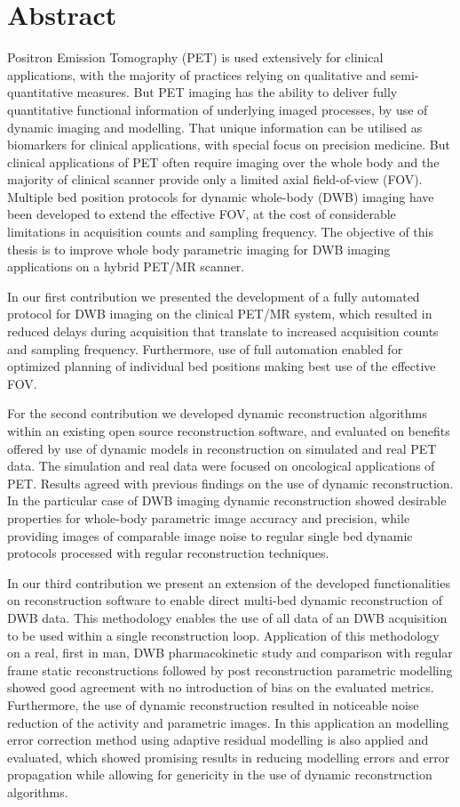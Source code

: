 \section*{Abstract}

Positron Emission Tomography (PET) is used extensively for clinical applications, with the majority of practices relying on qualitative and semi-quantitative measures. But PET imaging has the ability to deliver fully quantitative functional information of underlying imaged processes, by use of dynamic imaging and modelling. That unique information can be utilised as biomarkers for clinical applications, with special focus on precision medicine. But clinical applications of PET often require imaging over the whole body and the majority of clinical scanner provide only a limited axial field-of-view (FOV). Multiple bed position protocols for dynamic whole-body (DWB) imaging have been developed to extend the effective FOV, at the cost of considerable limitations in acquisition counts and sampling frequency.   The objective of this thesis is to improve whole body parametric imaging for DWB imaging applications on a hybrid PET/MR scanner.

In our first contribution we presented the development of a fully automated protocol for DWB imaging on the clinical PET/MR system, which resulted in reduced delays during acquisition that translate to increased acquisition counts and sampling frequency. Furthermore, use of full automation enabled for optimized planning of individual bed positions making best use of the effective FOV. 

For the second contribution we developed dynamic reconstruction algorithms within an existing open source reconstruction software, and evaluated on benefits offered by use of dynamic models in reconstruction on simulated and real PET data. 
The simulation and real data were focused on oncological applications of PET. Results agreed with previous findings on the use of dynamic reconstruction. In the particular case of DWB imaging dynamic reconstruction showed desirable properties for whole-body parametric image accuracy and precision, while providing images of comparable image noise to regular single bed dynamic protocols processed with regular reconstruction techniques.

In our third contribution we present an extension of the developed functionalities on reconstruction software to enable direct multi-bed dynamic reconstruction of DWB data. This methodology enables the use of all data of an DWB acquisition to be used within a single reconstruction loop. Application of this methodology on a real, first in man, DWB pharmacokinetic study and comparison with regular frame static reconstructions followed by post reconstruction parametric modelling showed good agreement with no introduction of bias on the evaluated metrics. Furthermore, the use of dynamic reconstruction resulted in noticeable noise reduction of the activity and parametric images. 
In this application an modelling error correction method using adaptive residual modelling is also applied and evaluated, which showed promising results in reducing modelling errors and error propagation while allowing for genericity in the use of dynamic reconstruction algorithms.

